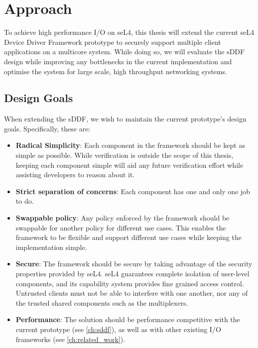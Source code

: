 \chapter{Approach}\label{ch:approach}
To achieve high performance I/O on seL4, this thesis will extend the current seL4 Device Driver Framework prototype 
to securely support multiple client applications on a multicore system. While doing so, 
we will evaluate the sDDF design while improving any bottlenecks in the current implementation
and optimise the system for large scale, high throughput networking systems.

\section{Design Goals}
When extending the sDDF, we wish to maintain the current prototype's design goals. 
Specifically, these are:
\begin{itemize}
\item \textbf{Radical Simplicity}: Each component in the framework should be kept as simple as possible. While verification is outside the scope
of this thesis, keeping each component simple will aid any future verification effort while assisting developers to reason about it.
\item \textbf{Strict separation of concerns}: Each component has one and only one job to do. 
\item \textbf{Swappable policy}: Any policy enforced by the framework should be swappable for another policy for different use cases.
This enables the framework to be flexible and support different use cases while keeping the implementation simple.
\item \textbf{Secure}: The framework should be secure by taking advantage of the security properties provided by seL4. seL4 guarantees
complete isolation of user-level components, and its capability system provides fine grained access control. Untrusted clients must not be able
to interfere with one another, nor any of the trusted shared components such as the multiplexers. 
\item \textbf{Performance}: The solution should be performance competitive with the current prototype (see \autoref{ch:sddf}),
as well as with other existing I/O frameworks (see \autoref{ch:related_work}).
\end{itemize}

